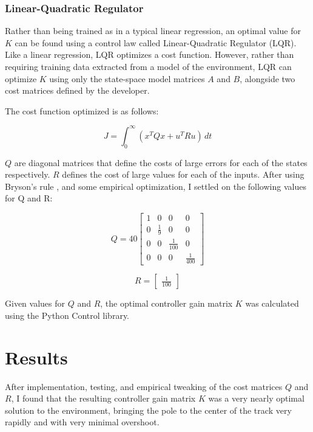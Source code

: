 \documentclass[12pt]{article}
\begin{document}
\subsubsection{Linear-Quadratic Regulator}

Rather than being trained as in a typical linear regression, an optimal value for $K$ can be found using a control law called Linear-Quadratic Regulator (LQR). Like a linear regression, LQR optimizes a cost function. However, rather than requiring training data extracted from a model of the environment, LQR can optimize $K$ using only the state-space model matrices $A$ and $B$, alongside two cost matrices defined by the developer.

The cost function optimized is as follows:

\begin{equation}
    J = \int _0 ^{\infty} \! (x ^T Q x + u ^T R u) \, dt
\end{equation}

$Q$ are diagonal matrices that define the costs of large errors for each of the states respectively. $R$ defines the cost of large values for each of the inputs. After using Bryson's rule \cite{veness}, and some empirical optimization, I settled on the following values for Q and R:

\begin{equation}
    Q = 40 \begin{bmatrix}
        1 & 0 & 0 & 0 \\
        0 & \frac{1}{9} & 0 & 0 \\
        0 & 0 & \frac{1}{100} & 0 \\
        0 & 0 & 0 & \frac{1}{400}
    \end{bmatrix}
\end{equation}

\begin{equation}
    R = \begin{bmatrix}
        \displaystyle
        \frac{1}{100}
    \end{bmatrix}
\end{equation}

Given values for $Q$ and $R$, the optimal controller gain matrix $K$ was calculated using the Python Control library.

\section{Results}

After implementation, testing, and empirical tweaking of the cost matrices $Q$ and $R$, I found that the resulting controller gain matrix $K$ was a very nearly optimal solution to the environment, bringing the pole to the center of the track very rapidly and with very minimal overshoot.
\end{document}
